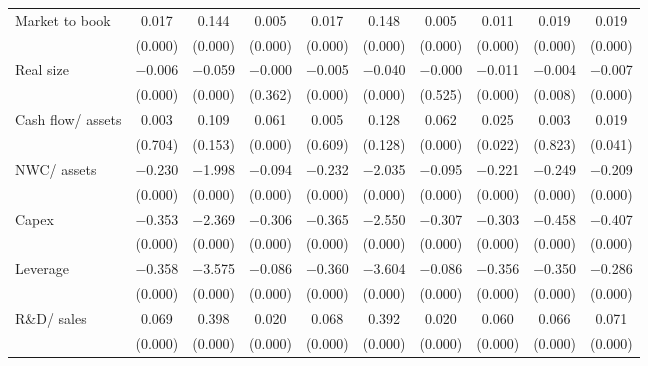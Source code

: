 {\begin{longtable}{l*{9}{c}}
\addlinespace
Market to book      &       0.017&       0.144&       0.005&       0.017&       0.148&       0.005&       0.011&       0.019&       0.019\\
                    &     (0.000)&     (0.000)&     (0.000)&     (0.000)&     (0.000)&     (0.000)&     (0.000)&     (0.000)&     (0.000)\\
\addlinespace
Real size           &    $-$0.006&    $-$0.059&    $-$0.000&    $-$0.005&    $-$0.040&    $-$0.000&    $-$0.011&    $-$0.004&    $-$0.007\\
                    &     (0.000)&     (0.000)&     (0.362)&     (0.000)&     (0.000)&     (0.525)&     (0.000)&     (0.008)&     (0.000)\\
\addlinespace
Cash flow/ assets   &       0.003&       0.109&       0.061&       0.005&       0.128&       0.062&       0.025&       0.003&       0.019\\
                    &     (0.704)&     (0.153)&     (0.000)&     (0.609)&     (0.128)&     (0.000)&     (0.022)&     (0.823)&     (0.041)\\
\addlinespace
NWC/ assets         &    $-$0.230&    $-$1.998&    $-$0.094&    $-$0.232&    $-$2.035&    $-$0.095&    $-$0.221&    $-$0.249&    $-$0.209\\
                    &     (0.000)&     (0.000)&     (0.000)&     (0.000)&     (0.000)&     (0.000)&     (0.000)&     (0.000)&     (0.000)\\
\addlinespace
Capex               &    $-$0.353&    $-$2.369&    $-$0.306&    $-$0.365&    $-$2.550&    $-$0.307&    $-$0.303&    $-$0.458&    $-$0.407\\
                    &     (0.000)&     (0.000)&     (0.000)&     (0.000)&     (0.000)&     (0.000)&     (0.000)&     (0.000)&     (0.000)\\
\addlinespace
Leverage            &    $-$0.358&    $-$3.575&    $-$0.086&    $-$0.360&    $-$3.604&    $-$0.086&    $-$0.356&    $-$0.350&    $-$0.286\\
                    &     (0.000)&     (0.000)&     (0.000)&     (0.000)&     (0.000)&     (0.000)&     (0.000)&     (0.000)&     (0.000)\\
\addlinespace
R\&D/ sales         &       0.069&       0.398&       0.020&       0.068&       0.392&       0.020&       0.060&       0.066&       0.071\\
                    &     (0.000)&     (0.000)&     (0.000)&     (0.000)&     (0.000)&     (0.000)&     (0.000)&     (0.000)&     (0.000)\\

\end{longtable}}
